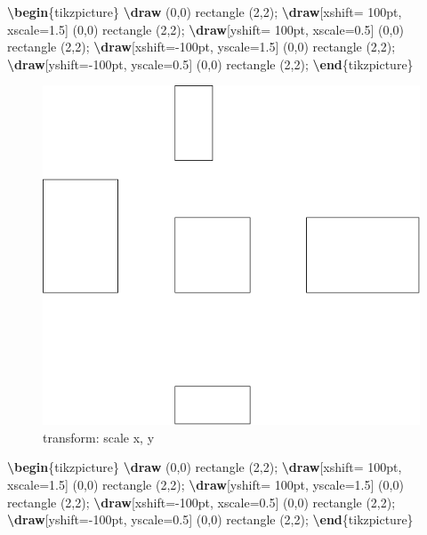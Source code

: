 \documentclass[
]{book}
\newenvironment{Shaded}{\begin{snugshade}}{\end{snugshade}}
\newcommand{\ExtensionTok}[1]{#1}
\newcommand{\FunctionTok}[1]{\textcolor[rgb]{0.13,0.29,0.53}{\textbf{#1}}}
\newcommand{\KeywordTok}[1]{\textcolor[rgb]{0.13,0.29,0.53}{\textbf{#1}}}
\newcommand{\NormalTok}[1]{#1}
\theoremstyle{definition}
\theoremstyle{definition}
\theoremstyle{definition}
\theoremstyle{definition}
\theoremstyle{remark}
\begin{document}
\begin{Shaded}
\begin{Highlighting}[]
\KeywordTok{\textbackslash{}begin}\NormalTok{\{}\ExtensionTok{tikzpicture}\NormalTok{\}}
  \FunctionTok{\textbackslash{}draw}\NormalTok{ (0,0) rectangle (2,2);}
  \FunctionTok{\textbackslash{}draw}\NormalTok{[xshift= 100pt, xscale=1.5] (0,0) rectangle (2,2);}
  \FunctionTok{\textbackslash{}draw}\NormalTok{[yshift= 100pt, xscale=0.5] (0,0) rectangle (2,2);}
  \FunctionTok{\textbackslash{}draw}\NormalTok{[xshift={-}100pt, yscale=1.5] (0,0) rectangle (2,2);}
  \FunctionTok{\textbackslash{}draw}\NormalTok{[yshift={-}100pt, yscale=0.5] (0,0) rectangle (2,2);}
\KeywordTok{\textbackslash{}end}\NormalTok{\{}\ExtensionTok{tikzpicture}\NormalTok{\}}
\end{Highlighting}
\end{Shaded}

\begin{figure}
\includegraphics[width=0.75\linewidth]{202401311000-TikZ_files/figure-latex/unnamed-chunk-47-1} \caption{transform: scale x, y}\label{fig:unnamed-chunk-47}
\end{figure}

\begin{Shaded}
\begin{Highlighting}[]
\KeywordTok{\textbackslash{}begin}\NormalTok{\{}\ExtensionTok{tikzpicture}\NormalTok{\}}
  \FunctionTok{\textbackslash{}draw}\NormalTok{ (0,0) rectangle (2,2);}
  \FunctionTok{\textbackslash{}draw}\NormalTok{[xshift= 100pt, xscale=1.5] (0,0) rectangle (2,2);}
  \FunctionTok{\textbackslash{}draw}\NormalTok{[yshift= 100pt, yscale=1.5] (0,0) rectangle (2,2);}
  \FunctionTok{\textbackslash{}draw}\NormalTok{[xshift={-}100pt, xscale=0.5] (0,0) rectangle (2,2);}
  \FunctionTok{\textbackslash{}draw}\NormalTok{[yshift={-}100pt, yscale=0.5] (0,0) rectangle (2,2);}
\KeywordTok{\textbackslash{}end}\NormalTok{\{}\ExtensionTok{tikzpicture}\NormalTok{\}}
\end{Highlighting}
\end{Shaded}
\end{document}
